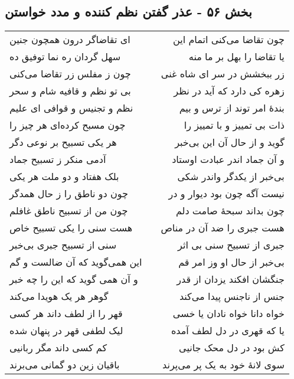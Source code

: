 \begin{center}
\section*{بخش ۵۶ - عذر گفتن نظم کننده و مدد خواستن}
\label{sec:sh056}
\begin{longtable}{l p{0.5cm} r}
ای تقاضاگر درون همچون جنین
&&
چون تقاضا می‌کنی اتمام این
\\
سهل گردان ره نما توفیق ده
&&
یا تقاضا را بهل بر ما منه
\\
چون ز مفلس زر تقاضا می‌کنی
&&
زر ببخشش در سر ای شاه غنی
\\
بی تو نظم و قافیه شام و سحر
&&
زهره کی دارد که آید در نظر
\\
نظم و تجنیس و قوافی ای علیم
&&
بندهٔ امر توند از ترس و بیم
\\
چون مسبح کرده‌ای هر چیز را
&&
ذات بی تمییز و با تمییز را
\\
هر یکی تسبیح بر نوعی دگر
&&
گوید و از حال آن این بی‌خبر
\\
آدمی منکر ز تسبیح جماد
&&
و آن جماد اندر عبادت اوستاد
\\
بلک هفتاد و دو ملت هر یکی
&&
بی‌خبر از یکدگر واندر شکی
\\
چون دو ناطق را ز حال همدگر
&&
نیست آگه چون بود دیوار و در
\\
چون من از تسبیح ناطق غافلم
&&
چون بداند سبحهٔ صامت دلم
\\
هست سنی را یکی تسبیح خاص
&&
هست جبری را ضد آن در مناص
\\
سنی از تسبیح جبری بی‌خبر
&&
جبری از تسبیح سنی بی اثر
\\
این همی‌گوید که آن ضالست و گم
&&
بی‌خبر از حال او وز امر قم
\\
و آن همی گوید که این را چه خبر
&&
جنگشان افکند یزدان از قدر
\\
گوهر هر یک هویدا می‌کند
&&
جنس از ناجنس پیدا می‌کند
\\
قهر را از لطف داند هر کسی
&&
خواه دانا خواه نادان یا خسی
\\
لیک لطفی قهر در پنهان شده
&&
یا که قهری در دل لطف آمده
\\
کم کسی داند مگر ربانیی
&&
کش بود در دل محک جانیی
\\
باقیان زین دو گمانی می‌برند
&&
سوی لانهٔ خود به یک پر می‌پرند
\\
\end{longtable}
\end{center}
